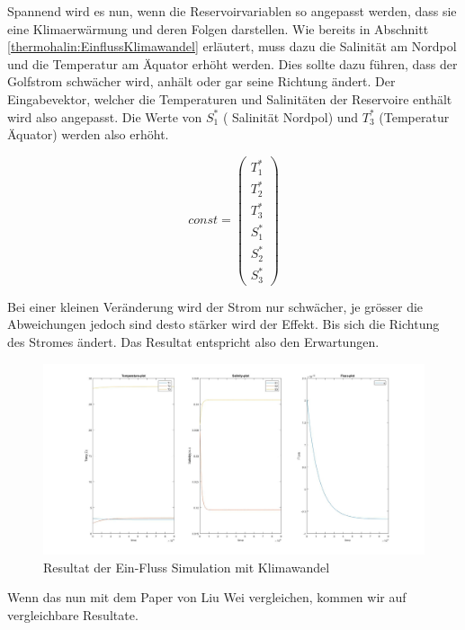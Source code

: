 Spannend wird es nun, wenn die Reservoirvariablen so angepasst werden, dass sie eine Klimaerwärmung und deren Folgen darstellen. Wie bereits in Abschnitt \ref{thermohalin:EinflussKlimawandel} erläutert, muss dazu die Salinität am Nordpol und die Temperatur am Äquator erhöht werden. Dies sollte dazu führen, dass der Golfstrom schwächer wird, anhält oder gar seine Richtung ändert. 
Der Eingabevektor, welcher die Temperaturen und Salinitäten der Reservoire enthält wird also angepasst.
Die Werte von $S_1^*$ ( Salinität Nordpol) und $T_3^*$ (Temperatur Äquator) werden also erhöht.

\begin{equation*}
const = \begin{pmatrix}T_{1}^{*} \\ T_{2}^{*} \\ T_{3}^{*} \\ S_{1}^{*} \\ S_{2}^{*} \\ S_{3}^{*}\end{pmatrix}
\end{equation*}



Bei einer kleinen Veränderung wird der Strom nur schwächer, je grösser die Abweichungen jedoch sind desto stärker wird der Effekt.
Bis sich die Richtung des Stromes ändert.
Das Resultat entspricht also den Erwartungen. 

\begin{figure}
	\centering
	\includegraphics[width=14cm]{thermohalin/Code/graphs/3b1f-skript-klimawandel.jpg}
	\caption{Resultat der Ein-Fluss Simulation mit Klimawandel}
	\label{thermohalin:3b1f-skript-klimawandel}
\end{figure}

Wenn das nun mit dem Paper von Liu Wei \cite{thermohalin:liuwei} vergleichen, kommen wir auf vergleichbare Resultate.



